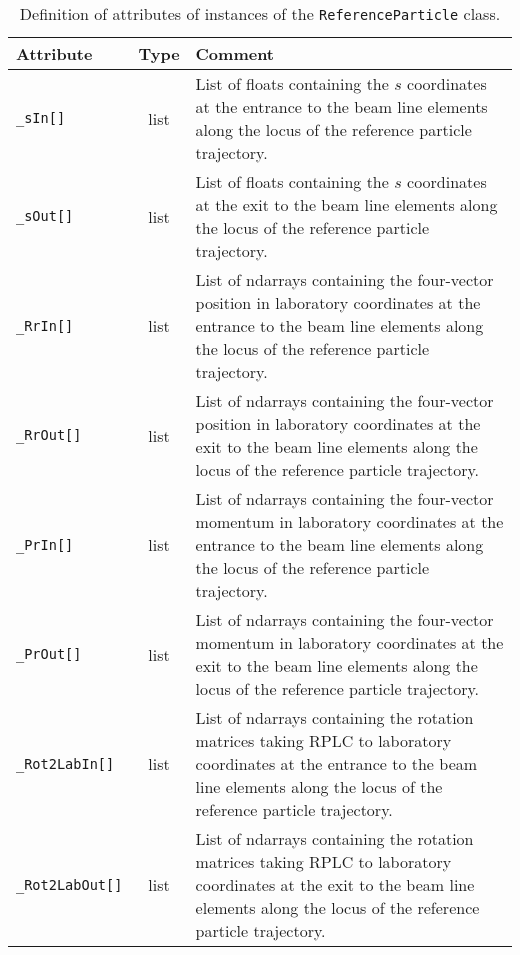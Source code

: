 \begin{table}[h]
  \caption{
    Definition of attributes of instances of the \texttt{ReferenceParticle} class.
  }
  \label{Tab:RP:Attributes}
  \begin{center}
    \begin{tabular}{|l|c|p{12cm}|}
      \hline
      \textbf{Attribute} & \textbf{Type} & \textbf{Comment}                                                                           \\
      \hline
      \texttt{\_sIn[]}   & list  & List of floats containing the $s$ coordinates at the entrance to the beam line elements along the
                                   locus of the reference particle trajectory.                                                        \\
      \texttt{\_sOut[]}  & list  & List of floats containing the $s$ coordinates at the exit to the beam line elements along the
                                   locus of the reference particle trajectory.                                                        \\
      \texttt{\_RrIn[]}  & list  & List of ndarrays containing the four-vector position in laboratory coordinates at the entrance to
                                   the beam line elements along the locus of the reference particle trajectory.                       \\
      \texttt{\_RrOut[]} & list  & List of ndarrays containing the four-vector position in laboratory coordinates at the exit to the
                                   beam line elements along the locus of the reference particle trajectory.                           \\
      \texttt{\_PrIn[]}  & list  & List of ndarrays containing the four-vector momentum in laboratory coordinates at the entrance to
                                   the beam line elements along the locus of the reference particle trajectory.                       \\
      \texttt{\_PrOut[]} & list  & List of ndarrays containing the four-vector momentum in laboratory coordinates at the exit to the
                                   beam line elements along the locus of the reference particle trajectory.                           \\
  \texttt{\_Rot2LabIn[]} & list  & List of ndarrays containing the rotation matrices taking RPLC to laboratory coordinates at the
                                   entrance to the beam line elements along the locus of the reference particle trajectory.           \\
 \texttt{\_Rot2LabOut[]} & list  & List of ndarrays containing the rotation matrices taking RPLC to laboratory coordinates at the
                                   exit to the beam line elements along the locus of the reference particle trajectory.               \\
      \hline
    \end{tabular}
  \end{center}
\end{table}
